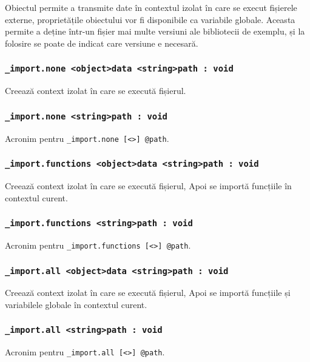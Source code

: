 Obiectul  permite a transmite date în contextul izolat în care se execut fișierele externe, proprietățile obiectului  vor fi disponibile ca variabile globale. Aceasta permite a deține într-un fișier mai multe versiuni ale bibliotecii de exemplu, și la folosire se poate de indicat care versiune e necesară.

\subsubsection{\lstinline|_import.none <object>data <string>path : void|}

Creează context izolat în care se execută fișierul.

\subsubsection{\lstinline|_import.none <string>path : void|}

Acronim pentru \lstinline|_import.none [<>] @path|.

\subsubsection{\lstinline|_import.functions <object>data <string>path : void|}

Creează context izolat în care se execută fișierul, Apoi se importă funcțiile în contextul curent.

\subsubsection{\lstinline|_import.functions <string>path : void|}

Acronim pentru \lstinline|_import.functions [<>] @path|.

\subsubsection{\lstinline|_import.all <object>data <string>path : void|}

Creează context izolat în care se execută fișierul, Apoi se importă funcțiile și variabilele globale în contextul curent.

\subsubsection{\lstinline|_import.all <string>path : void|}

Acronim pentru \lstinline|_import.all [<>] @path|.

